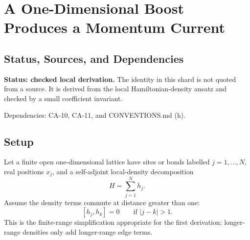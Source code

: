 
\section{A One-Dimensional Boost Produces a Momentum Current}
\label{sec:lattice-boost-current-1d}

\subsection{Status, Sources, and Dependencies}

\textbf{Status: checked local derivation.}  The identity in this shard is not
quoted from a source.  It is derived from the local Hamiltonian-density ansatz
and checked by a small coefficient invariant.

Dependencies: CA-10, CA-11, and CONVENTIONS.md (h).


\subsection{Setup}

Let a finite open one-dimensional lattice have sites or bonds labelled
\(j=1,\ldots,N\), real positions \(x_j\), and a self-adjoint local-density
decomposition
\[
  H=\sum_{j=1}^N h_j.
\]
Assume the density terms commute at distance greater than one:
\[
  [h_j,h_k]=0\qquad\text{if }|j-k|>1.
\]
This is the finite-range simplification appropriate for the first derivation;
longer-range densities only add longer-range edge terms.

